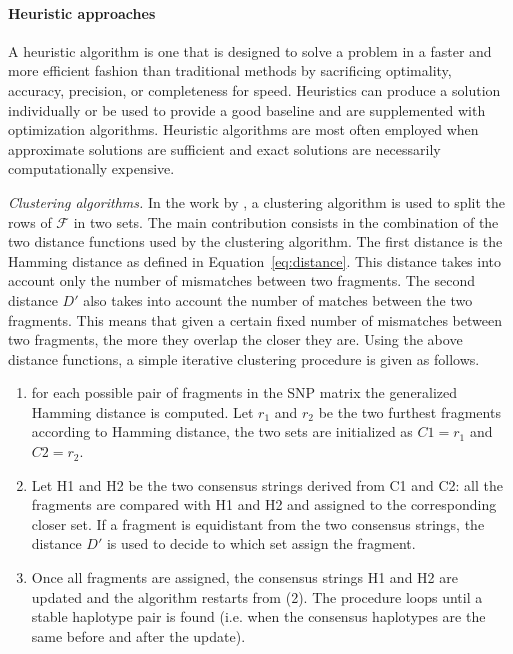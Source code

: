 \paragraph{Heuristic approaches}
A heuristic algorithm is one that is designed to solve a problem in a faster and more efficient fashion than traditional methods by sacrificing optimality, accuracy, precision, or completeness for speed.
Heuristics can produce a solution individually or be used to provide a good baseline and are supplemented with optimization algorithms. Heuristic algorithms are most often employed when approximate solutions are sufficient and exact solutions are necessarily computationally expensive.

\textit{Clustering algorithms.} In the work by \citep{wang2007clustering}, a clustering algorithm is used to split the rows of $\mathcal{F}$ in two sets. 
The main contribution consists in the combination of the two distance functions used by the clustering algorithm. 
The first distance is the Hamming distance as defined in Equation~\ref{eq:distance}. This distance takes into account only the number of mismatches between two fragments. 
The second distance $D'$ also takes into account the number of matches between the two fragments.
This means that given a certain fixed number of mismatches between two fragments, the more they overlap the closer they are.
Using the above distance functions, a simple iterative clustering procedure is given as follows.
\begin{enumerate}
 \item for each possible pair of fragments in the SNP matrix the generalized Hamming distance is computed. Let $r_1$ and $r_2$ be the two furthest fragments according to Hamming distance, the two sets are initialized as $C1 = r_1$ and $C2 = r_2$.
  \item Let H1 and H2 be the two consensus strings derived from C1 and C2: all the fragments are compared with H1 and H2 and assigned to the corresponding closer set. If a fragment is equidistant from the two consensus strings, the distance $D'$ is used to decide to which set assign the fragment.
  \item Once all fragments are assigned, the consensus strings H1 and H2 are updated and the algorithm restarts from (2). The procedure loops until a stable haplotype pair is found (i.e. when the consensus haplotypes are the same before and after the update).
\end{enumerate}

